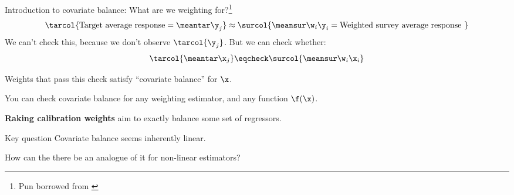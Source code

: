 

\begin{frame}[t]{Introduction to covariate balance: What are we weighting for?\footnote{Pun borrowed from \textcite{solon:2015:weightingfor}}}
$$
\tarcol{\textrm{Target average response} =
\meantar \y_j} \approx \surcol{\meansur \w_i \y_i
= \textrm{Weighted survey average response }}
$$
We can't check this, because we don't observe $\tarcol{\y_j}$.  \pause But we can check whether:
$$
    \tarcol{\meantar \x_j} \eqcheck \surcol{\meansur \w_i \x_i}
$$

Weights that pass this check satisfy ``covariate balance'' for $\x$.

\pause

\vspace{1em}

You can check covariate balance for any weighting estimator,
and any function $\f(\x)$.

\textbf{Raking calibration weights} aim to exactly balance some set of regressors.


\pause

\begin{block}{Key question}
%
Covariate balance seems inherently linear. 

How can the there be an analogue of it for non-linear estimators?
%
\end{block}


\end{frame}





